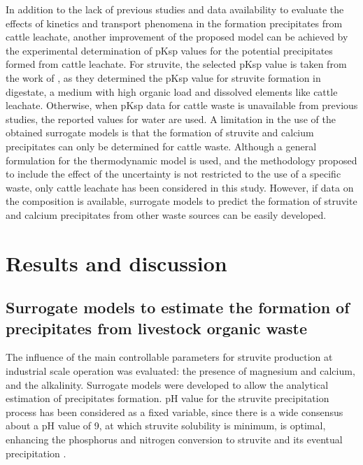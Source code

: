 \begin{refsection}[referencesCh3]
In addition to the lack of previous studies and data availability to evaluate the effects of kinetics and transport phenomena in the formation precipitates from cattle leachate, another improvement of the proposed model can be achieved by the experimental determination of pKsp values for the potential precipitates formed from cattle leachate. For struvite, the selected pKsp value is taken from the work of \citet{Ohlinger}, as they determined the pKsp value for struvite formation in digestate, a medium with high organic load and dissolved elements like cattle leachate. Otherwise, when pKsp data for cattle waste is unavailable from previous studies, the reported values for water are used. A limitation in the use of the obtained surrogate models is that the formation of struvite and calcium precipitates can only be determined for cattle waste. Although a general formulation for the thermodynamic model is used, and the methodology proposed to include the effect of the uncertainty is not restricted to the use of a specific waste, only cattle leachate has been considered in this study. However, if data on the composition is available, surrogate models to predict the formation of struvite and calcium precipitates from other waste sources can be easily developed.

\section{Results and discussion}
\subsection{Surrogate models to estimate the formation of precipitates from livestock organic waste} \label{results}
The influence of the main controllable parameters for struvite production at industrial scale operation was evaluated: the presence of magnesium and calcium, and the alkalinity. Surrogate models were developed to allow the analytical estimation of precipitates formation. pH value for the struvite precipitation process has been considered as a fixed variable, since there is a wide consensus about a pH value of 9, at which struvite solubility is minimum, is optimal, enhancing the phosphorus and nitrogen conversion to struvite and its eventual precipitation \citep{Tao, Zeng}.


\end{refsection}
